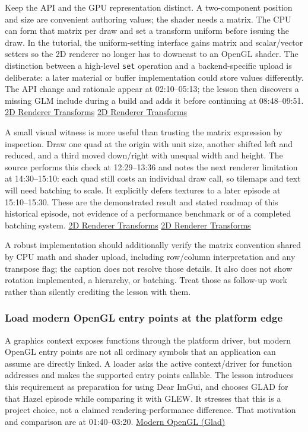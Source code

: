 Keep the API and the GPU representation distinct. A two-component position and size are convenient authoring values; the shader needs a matrix. The CPU can form that matrix per draw and set a transform uniform before issuing the draw. In the tutorial, the uniform-setting interface gains matrix and scalar/vector setters so the 2D renderer no longer has to downcast to an OpenGL shader. The distinction between a high-level \texttt{set} operation and a backend-specific upload is deliberate: a later material or buffer implementation could store values differently. The API change and rationale appear at 02:10--05:13; the lesson then discovers a missing GLM include during a build and adds it before continuing at 08:48--09:51. \href{https://www.youtube.com/watch?v=-Qt12lcAF0Y&t=130s}{2D Renderer Transforms} \href{https://www.youtube.com/watch?v=-Qt12lcAF0Y&t=528s}{2D Renderer Transforms}

A small visual witness is more useful than trusting the matrix expression by inspection. Draw one quad at the origin with unit size, another shifted left and reduced, and a third moved down/right with unequal width and height. The source performs this check at 12:29--13:36 and notes the next renderer limitation at 14:30--15:10: each quad still costs an individual draw call, so tilemaps and text will need batching to scale. It explicitly defers textures to a later episode at 15:10--15:30. These are the demonstrated result and stated roadmap of this historical episode, not evidence of a performance benchmark or of a completed batching system. \href{https://www.youtube.com/watch?v=-Qt12lcAF0Y&t=749s}{2D Renderer Transforms} \href{https://www.youtube.com/watch?v=-Qt12lcAF0Y&t=870s}{2D Renderer Transforms}

A robust implementation should additionally verify the matrix convention shared by CPU math and shader upload, including row/column interpretation and any transpose flag; the caption does not resolve those details. It also does not show rotation implemented, a hierarchy, or batching. Treat those as follow-up work rather than silently crediting the lesson with them.

\subsubsection{Load modern OpenGL entry points at the platform edge}\label{load-modern-opengl-entry-points-at-the-platform-edge}

A graphics context exposes functions through the platform driver, but modern OpenGL entry points are not all ordinary symbols that an application can assume are directly linked. A loader asks the active context/driver for function addresses and makes the supported entry points callable. The lesson introduces this requirement as preparation for using Dear ImGui, and chooses GLAD for that Hazel episode while comparing it with GLEW. It stresses that this is a project choice, not a claimed rendering-performance difference. That motivation and comparison are at 01:40--03:20. \href{https://www.youtube.com/watch?v=HFyHIc89z1g&t=100s}{Modern OpenGL (Glad)}

